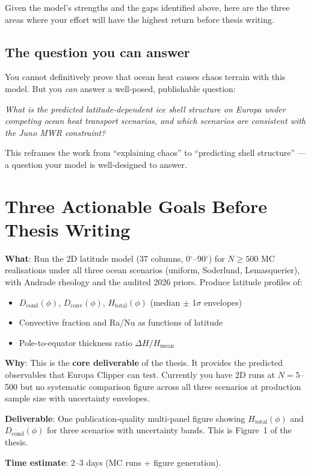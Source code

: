 \documentclass[11pt,a4paper]{article}
\begin{document}
Given the model's strengths and the gaps identified above, here are the
three areas where your effort will have the highest return before thesis
writing.

\subsection{The question you can answer}

You cannot definitively prove that ocean heat causes chaos terrain with this
model. But you \textit{can} answer a well-posed, publishable question:

\begin{actionbox}
\textit{What is the predicted latitude-dependent ice shell structure on
Europa under competing ocean heat transport scenarios, and which scenarios
are consistent with the Juno MWR constraint?}
\end{actionbox}

This reframes the work from ``explaining chaos'' to ``predicting shell
structure'' --- a question your model is well-designed to answer.

\section{Three Actionable Goals Before Thesis Writing}

\begin{actionbox}
\textbf{What}: Run the 2D latitude model (37 columns, 0$^\circ$--90$^\circ$)
for $N \geq 500$ MC realisations under all three ocean scenarios (uniform,
Soderlund, Lemasquerier), with Andrade rheology and the audited 2026 priors.
Produce latitude profiles of:
\begin{itemize}[leftmargin=1.5em]
\item $D_\mathrm{cond}(\phi)$, $D_\mathrm{conv}(\phi)$, $H_\mathrm{total}(\phi)$
      (median $\pm$ 1$\sigma$ envelopes)
\item Convective fraction and Ra/Nu as functions of latitude
\item Pole-to-equator thickness ratio $\Delta H / H_\mathrm{mean}$
\end{itemize}

\textbf{Why}: This is the \textbf{core deliverable} of the thesis. It
provides the predicted observables that Europa Clipper can test.
Currently you have 2D runs at $N = 5$--500 but no systematic comparison
figure across all three scenarios at production sample size with
uncertainty envelopes.

\textbf{Deliverable}: One publication-quality multi-panel figure showing
$H_\mathrm{total}(\phi)$ and $D_\mathrm{cond}(\phi)$ for three scenarios
with uncertainty bands. This is Figure~1 of the thesis.

\textbf{Time estimate}: 2--3 days (MC runs + figure generation).
\end{actionbox}
\end{document}
